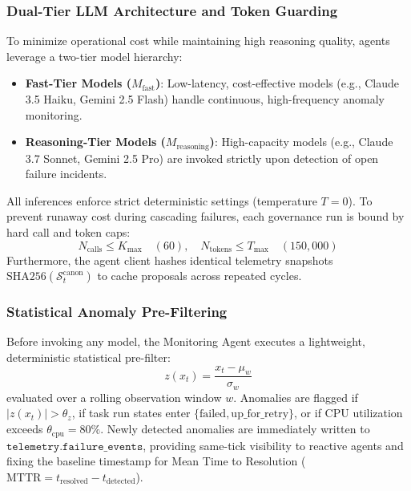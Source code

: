\subsubsection{Dual-Tier LLM Architecture and Token Guarding}
To minimize operational cost while maintaining high reasoning quality, agents leverage a two-tier model hierarchy:
\begin{itemize}
    \item \textbf{Fast-Tier Models ($M_{\text{fast}}$)}: Low-latency, cost-effective models (e.g., Claude 3.5 Haiku, Gemini 2.5 Flash) handle continuous, high-frequency anomaly monitoring.
    \item \textbf{Reasoning-Tier Models ($M_{\text{reasoning}}$)}: High-capacity models (e.g., Claude 3.7 Sonnet, Gemini 2.5 Pro) are invoked strictly upon detection of open failure incidents.
\end{itemize}
All inferences enforce strict deterministic settings (temperature $T = 0$). To prevent runaway cost during cascading failures, each governance run is bound by hard call and token caps:
\begin{equation}
N_{\text{calls}} \le K_{\max} \quad (60), \quad N_{\text{tokens}} \le T_{\max} \quad (150{,}000)
\end{equation}
Furthermore, the agent client hashes identical telemetry snapshots $\text{SHA256}(\mathcal{S}_t^{\text{canon}})$ to cache proposals across repeated cycles.

\subsubsection{Statistical Anomaly Pre-Filtering}
Before invoking any model, the Monitoring Agent executes a lightweight, deterministic statistical pre-filter:
\begin{equation}
z(x_t) = \frac{x_t - \mu_w}{\sigma_w}
\end{equation}
evaluated over a rolling observation window $w$. Anomalies are flagged if $|z(x_t)| > \theta_z$, if task run states enter $\{\text{failed}, \text{up\_for\_retry}\}$, or if CPU utilization exceeds $\theta_{\text{cpu}} = 80\%$. Newly detected anomalies are immediately written to $\texttt{telemetry.failure\_events}$, providing same-tick visibility to reactive agents and fixing the baseline timestamp for Mean Time to Resolution ($\text{MTTR} = t_{\text{resolved}} - t_{\text{detected}}$).

